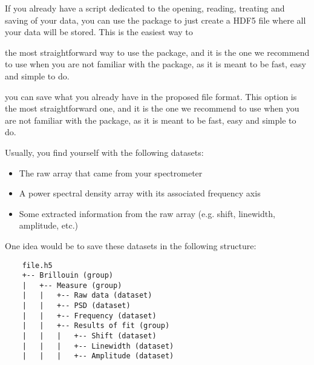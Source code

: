 If you already have a script dedicated to the opening, reading, treating and saving of your data, you can use the package to just create a HDF5 file where all your data will be stored. This is the easiest way to 

the most straightforward way to use the package, and it is the one we recommend to use when you are not familiar with the package, as it is meant to be fast, easy and simple to do.


you can save what you already have in the proposed file format. This option is the most straightforward one, and it is the one we recommend to use when you are not familiar with the package, as it is meant to be fast, easy and simple to do.

Usually, you find yourself with the following datasets:
\begin{itemize}
    \item The raw array that came from your spectrometer
    \item A power spectral density array with its associated frequency axis
    \item Some extracted information from the raw array (e.g. shift, linewidth, amplitude, etc.)
\end{itemize}

One idea would be to save these datasets in the following structure:
\begin{verbatim}
    file.h5
    +-- Brillouin (group)
    |   +-- Measure (group)
    |   |   +-- Raw data (dataset)
    |   |   +-- PSD (dataset)
    |   |   +-- Frequency (dataset)
    |   |   +-- Results of fit (group)
    |   |   |   +-- Shift (dataset)
    |   |   |   +-- Linewidth (dataset)
    |   |   |   +-- Amplitude (dataset)
\end{verbatim}


